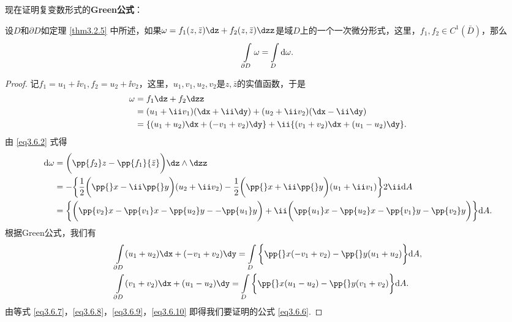 现在证明复变数形式的\textbf{Green公式}：
\begin{theorem}\label{thm3.6.1}
设$D$和$\partial D$如定理 \ref{thm3.2.5} 中所述，如果$\omega=f_1(z,\bar z)\dz+f_2(z,\bar z)\dzz$是域$D$上的一个一次微分形式，这里，$f_1,f_2\in C^1(\bar D)$，那么
\begin{equation}\label{eq3.6.6}
\int\limits_{\partial D}\omega=\int\limits_D\textrm d\omega.
\end{equation}
\end{theorem}
\begin{proof}
记$f_1=u_1+\ii v_1,f_2=u_2+\ii v_2$，这里，$u_1,v_1,u_2,v_2$是$z,\bar z$的实值函数，于是
\begin{equation}\label{eq3.6.7}
\begin{aligned}
\omega&=f_1\dz+f_2\dzz\\
&=(u_1+\ii v_1)(\dx+\ii\dy)+(u_2+\ii v_2)(\dx-\ii\dy)\\
&=\{(u_1+u_2)\dx+(-v_1+v_2)\dy\}+\ii\{(v_1+v_2)\dx+(u_1-u_2)\dy\}.
\end{aligned}
\end{equation}
由 \eqref{eq3.6.2} 式得
\begin{equation}\label{eq3.6.8}
\begin{aligned}
\textrm d\omega&=\bigg(\pp{f_2}z-\pp{f_1}{\bar z}\bigg)\dz\wedge\dzz\\
&=-\bigg\{\frac12\bigg(\pp{}x-\ii\pp{}y\bigg)(u_2+\ii v_2)
 -\frac12\bigg(\pp{}x+\ii\pp{}y\bigg)(u_1+\ii v_1)\bigg\}2\ii\textrm dA\\
&=\bigg\{\bigg(\pp{v_2}x-\pp{v_1}x-\pp{u_2}y--\pp{u_1}y\bigg)
+\ii\bigg(\pp{u_1}x-\pp{u_2}x-\pp{v_1}y-\pp{v_2}y\bigg)\bigg\}\textrm dA.
\end{aligned}
\end{equation}
根据Green公式，我们有
\begin{align}
&\int\limits_{\partial D}(u_1+u_2)\dx+(-v_1+v_2)\dy
=\int\limits_D\bigg\{\pp{}x(-v_1+v_2)-\pp{}y(u_1+u_2)\bigg\}\textrm dA,\label{eq3.6.9}\\
&\int\limits_{\partial D}(v_1+v_2)\dx+(u_1-u_2)\dy
=\int\limits_D\bigg\{\pp{}x(u_1-u_2)-\pp{}y(v_1+v_2)\bigg\}\textrm dA.\label{eq3.6.10}
\end{align}
由等式 \eqref{eq3.6.7}，\eqref{eq3.6.8}，\eqref{eq3.6.9}，\eqref{eq3.6.10} 即得我们要证明的公式 \eqref{eq3.6.6}.
\end{proof}

